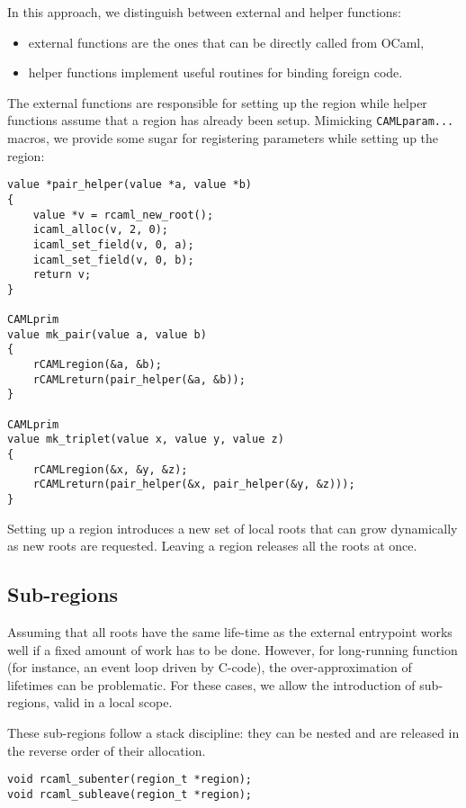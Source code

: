 \documentclass[a4paper]{easychair}
\begin{document}
In this approach, we distinguish between external and helper functions:

\begin{itemize}
\item external functions are the ones that can be directly called from OCaml,
\item helper functions implement useful routines for binding foreign code.
\end{itemize}

The external functions are responsible for setting up the region while
helper functions assume that a region has already been setup. Mimicking
\texttt{CAMLparam...} macros, we provide some sugar for registering
parameters while setting up the region:

\begin{lstlisting}[]
value *pair_helper(value *a, value *b)
{
    value *v = rcaml_new_root();
    icaml_alloc(v, 2, 0);
    icaml_set_field(v, 0, a);
    icaml_set_field(v, 0, b);
    return v;
}

CAMLprim
value mk_pair(value a, value b)
{
    rCAMLregion(&a, &b);
    rCAMLreturn(pair_helper(&a, &b));
}

CAMLprim
value mk_triplet(value x, value y, value z)
{
    rCAMLregion(&x, &y, &z);
    rCAMLreturn(pair_helper(&x, pair_helper(&y, &z)));
}
\end{lstlisting}

Setting up a region introduces a new set of local roots that can grow
dynamically as new roots are requested. Leaving a region releases all
the roots at once.

\subsection{Sub-regions}

Assuming that all roots have the same life-time as the external
entrypoint works well if a fixed amount of work has to be done. However,
for long-running function (for instance, an event loop driven by
C-code), the over-approximation of lifetimes can be problematic. For
these cases, we allow the introduction of sub-regions, valid in a local
scope.

These sub-regions follow a stack discipline: they can be nested and are
released in the reverse order of their allocation.

\begin{lstlisting}[]
void rcaml_subenter(region_t *region);
void rcaml_subleave(region_t *region);
\end{lstlisting}
\end{document}
